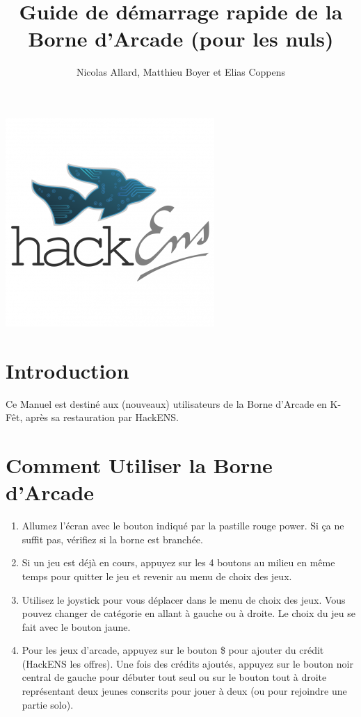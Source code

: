 \documentclass{article}
\title{Guide de démarrage rapide de la Borne d'Arcade (pour les nuls)}
\author{Nicolas Allard, Matthieu Boyer et Elias Coppens}
\date{}
\begin{document}
\maketitle
\begin{center}
    \includegraphics{thumb.png}
\end{center}
\section*{Introduction}
Ce Manuel est destiné aux (nouveaux) utilisateurs de la Borne d'Arcade en K-Fêt, après sa restauration par HackENS.

\section*{Comment Utiliser la Borne d'Arcade}
\begin{enumerate}
    \item Allumez l'écran avec le bouton indiqué par la pastille rouge power. Si ça ne suffit pas, vérifiez si la borne est branchée.
    \item Si un jeu est déjà en cours, appuyez sur les 4 boutons au milieu en même temps pour quitter le jeu et revenir au menu de choix des jeux.
    \item Utilisez le joystick pour vous déplacer dans le menu de choix des jeux. Vous pouvez changer de catégorie en allant à gauche ou à droite. Le choix du jeu se fait avec le bouton jaune.
    \item Pour les jeux d'arcade, appuyez sur le bouton \$ pour ajouter du crédit (HackENS les offres). Une fois des crédits ajoutés, appuyez sur le bouton noir central de gauche pour débuter tout seul ou sur le bouton tout à droite représentant deux jeunes conscrits pour jouer à deux (ou pour rejoindre une partie solo). 
\end{enumerate}
\end{document}
